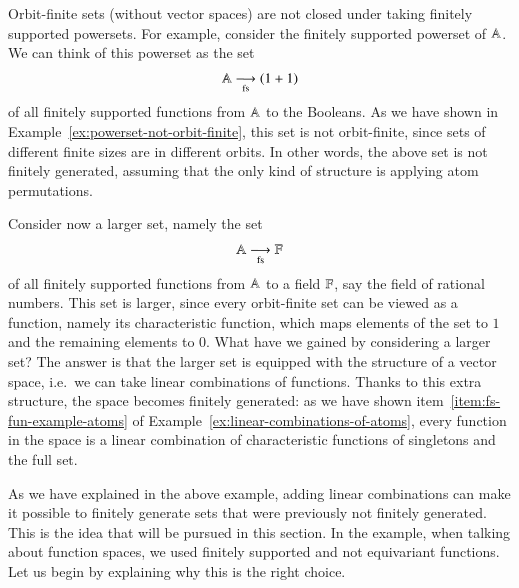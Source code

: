 \begin{myexample}\label{ex:adding-linear-combinations-makes-finitely-generated}  Orbit-finite sets (without vector spaces) are not closed under taking finitely supported powersets. For example, consider the finitely supported powerset of $\mathbb A$. We can think of this powerset as the 
    set 
    \begin{align*}
    \mathbb A \underset{\text{fs}}{\longrightarrow} (1+1)
    \end{align*}
    of all finitely supported functions from $\mathbb A$ to the Booleans. As we have shown in Example~\ref{ex:powerset-not-orbit-finite}, this set is not orbit-finite, since sets of different finite sizes are in different orbits. In other words, the above set is not finitely generated, assuming that the only kind of structure is applying atom permutations.

    Consider now a larger set, namely the set 
    \begin{align*}
    \mathbb A \underset{\text{fs}}{\longrightarrow} \mathbb F
    \end{align*}
    of all finitely supported functions from $\mathbb A$ to a field $\mathbb F$, say the field of rational numbers. This set is larger, since every orbit-finite set can be viewed as a function, namely its characteristic function, which maps elements of the set to $1$ and the remaining elements to $0$. What have we gained by considering a larger set? The answer is that the larger set is equipped with the structure of a vector space, i.e.~we can take linear combinations of functions. Thanks to this extra structure, the space becomes finitely generated: as we have shown item~\ref{item:fs-fun-example-atoms} of Example~\ref{ex:linear-combinations-of-atoms}, every function in the space is a linear combination of characteristic functions of singletons and the full set. 
\end{myexample}

As we have explained in the above example, adding linear combinations can make it possible to finitely generate sets that were previously not finitely generated. This is the idea that will be pursued in this section. In the example, when talking about function spaces, we used finitely supported and not equivariant functions. Let us begin by explaining why this is the right choice.

